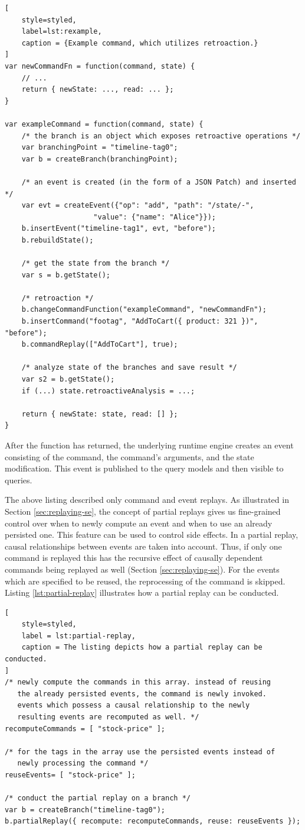 \begin{lstlisting}[
	style=styled,
	label=lst:rexample,
	caption = {Example command, which utilizes retroaction.}
]
var newCommandFn = function(command, state) {
	// ... 
	return { newState: ..., read: ... };
}

var exampleCommand = function(command, state) {
	/* the branch is an object which exposes retroactive operations */
	var branchingPoint = "timeline-tag0";
	var b = createBranch(branchingPoint);

	/* an event is created (in the form of a JSON Patch) and inserted */
	var evt = createEvent({"op": "add", "path": "/state/-", 
				     "value": {"name": "Alice"}});
	b.insertEvent("timeline-tag1", evt, "before");
	b.rebuildState();

	/* get the state from the branch */
	var s = b.getState();

	/* retroaction */
	b.changeCommandFunction("exampleCommand", "newCommandFn");
	b.insertCommand("footag", "AddToCart({ product: 321 })", "before");
	b.commandReplay(["AddToCart"], true);

	/* analyze state of the branches and save result */
	var s2 = b.getState();
	if (...) state.retroactiveAnalysis = ...;

	return { newState: state, read: [] };
}
\end{lstlisting}

After the function has returned, the underlying runtime engine creates an event
consisting of the command, the command's arguments, and the state modification.
This event is published to the query models and then visible to queries.

The above listing described only command and event replays.
As illustrated in Section \ref{sec:replaying-se}, the concept of partial replays 
gives us fine-grained control over when to newly compute an event and when to use 
an already persisted one. This feature can be used to control side effects.
In a partial replay, causal relationships between events are taken into
account. Thus, if only one command is replayed this has the recursive effect of
causally dependent commands being replayed as well (Section \ref{sec:replaying-se}).
For the events which are specified to be reused, the reprocessing of the
command is skipped.
Listing \ref{lst:partial-replay} illustrates how a partial replay can be conducted.

\begin{lstlisting}[
	style=styled,
	label = lst:partial-replay,
	caption = The listing depicts how a partial replay can be conducted.
]
/* newly compute the commands in this array. instead of reusing 
   the already persisted events, the command is newly invoked. 
   events which possess a causal relationship to the newly 
   resulting events are recomputed as well. */
recomputeCommands = [ "stock-price" ];

/* for the tags in the array use the persisted events instead of 
   newly processing the command */
reuseEvents= [ "stock-price" ];

/* conduct the partial replay on a branch */
var b = createBranch("timeline-tag0");
b.partialReplay({ recompute: recomputeCommands, reuse: reuseEvents });
\end{lstlisting}

